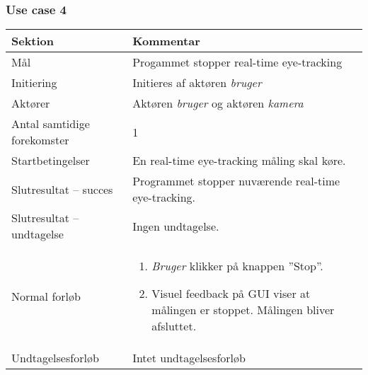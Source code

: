 \documentclass[rapport.tex]{subfiles}
\begin{document}
		\subsubsection{Use case 4}
			\begin{tabular}{|l|p{7.7cm}|}
				\hline \textbf{Sektion} 	& \textbf{Kommentar} \\ 
				\hline Mål  & Progammet stopper real-time eye-tracking \\ 
				\hline Initiering  & Initieres af aktøren \textit{bruger} \\ 
				\hline Aktører & Aktøren \textit{bruger} og aktøren \textit{kamera} \\ 
				\hline Antal samtidige forekomster & 1 \\ 
				\hline Startbetingelser & En real-time eye-tracking måling  skal køre.   \\ 
				\hline Slutresultat – succes & Programmet stopper nuværende real-time eye-tracking.\\ 
				\hline Slutresultat – undtagelse & Ingen undtagelse. \\ 
				\hline Normal forløb & \begin{enumerate}
					\item \textit{Bruger} klikker på knappen ”Stop”.
					\item Visuel feedback på GUI viser at målingen er stoppet. Målingen bliver afsluttet. 
				\end{enumerate} \\ 
				\hline Undtagelsesforløb & Intet undtagelsesforløb \\ 
				\hline 
			\end{tabular}
\end{document}

